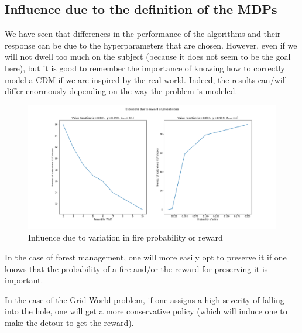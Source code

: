 \documentclass[11pt]{article}
\begin{document}
\begin{multicols}{2}
\subsection{Influence due to the definition of the MDPs}

We have seen that differences in the performance of the algorithms and their response can be due to the hyperparameters that are chosen. However, even if we will not dwell too much on the subject (because it does not seem to be the goal here), but it is good to remember the importance of knowing how to correctly model a CDM if we are inspired by the real world. Indeed, the results can/will differ enormously depending on the way the problem is modeled.

\begin{figure}[H]
\centering
\includegraphics[width =  0.9\columnwidth]{Influence_rew_pb.png}
\caption{Influence due to variation in fire probability or reward}
\end{figure}

In the case of forest management, one will more easily opt to preserve it if one knows that the probability of a fire and/or the reward for preserving it is important.

In the case of the Grid World problem, if one assigns a high severity of falling into the hole, one will get a more conservative policy (which will induce one to make the detour to get the reward).


\end{multicols}
\end{document}
